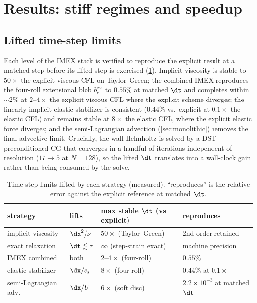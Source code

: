 \section{Results: stiff regimes and speedup}
\label{sec:results}

\subsection{Lifted time-step limits}
Each level of the IMEX stack is verified to reproduce the explicit result at a matched
step before its lifted step is exercised (\cref{tab:cfl-lift}). Implicit viscosity is
stable to $50\times$ the explicit viscous CFL on Taylor--Green; the combined IMEX
reproduces the four-roll extensional blob $b_e^{xx}$ to $0.55\%$ at matched $\dt$ and
completes within ${\sim}2\%$ at $2$--$4\times$ the explicit viscous CFL where the
explicit scheme diverges; the linearly-implicit elastic stabilizer is consistent
($0.44\%$ vs.\ explicit at $0.1\times$ the elastic CFL) and remains stable at
$8\times$ the elastic CFL, where the explicit elastic force diverges; and the
semi-Lagrangian advection (\cref{sec:monolithic}) removes the final advective limit.
Crucially, the wall Helmholtz is solved by a DST-preconditioned CG that converges in a
handful of iterations independent of resolution ($17\!\to\!5$ at $N{=}128$), so the
lifted $\dt$ translates into a wall-clock gain rather than being consumed by the solve.

\begin{table}[t]\centering\small
\caption{Time-step limits lifted by each strategy (measured). ``reproduces'' is the
relative error against the explicit reference at matched $\dt$.}
\label{tab:cfl-lift}
\begin{tabular}{@{}llll@{}}
\toprule
strategy & lifts & max stable $\dt$ (vs explicit) & reproduces \\
\midrule
implicit viscosity & $\dx^2/\nu$ & $50\times$ (Taylor--Green) & 2nd-order retained \\
exact relaxation & $\dt\lesssim\tau$ & $\infty$ (step-strain exact) & machine precision \\
IMEX combined & both & $2$--$4\times$ (four-roll) & $0.55\%$ \\
elastic stabilizer & $\dx/c_s$ & $8\times$ (four-roll) & $0.44\%$ at $0.1\times$ \\
semi-Lagrangian adv. & $\dx/U$ & $6\times$ (soft disc) & $2.2\times10^{-3}$ at matched $\dt$ \\
\bottomrule
\end{tabular}
\end{table}

